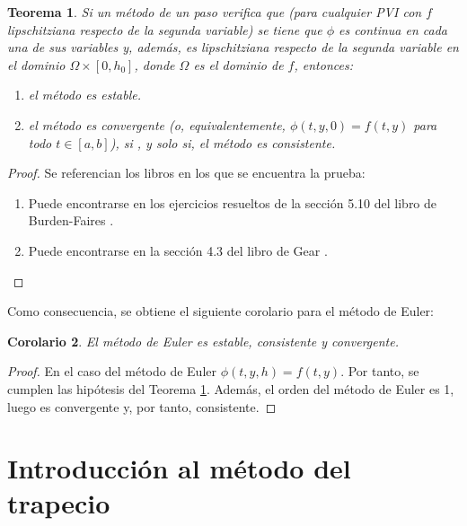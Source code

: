 \documentclass{article}
\theoremstyle{theorem-style}  %
\newtheorem{theorem}{Teorema}[section]  %
\newtheorem{corollary}[theorem]{Corolario} %
\theoremstyle{definition-style}
\theoremstyle{example-style}
\begin{document}
	\begin{theorem} \label{theorem:stability}
		Si un método de un paso verifica que (para cualquier PVI con $f$ lipschitziana respecto de la segunda variable) se tiene que $\phi$ es continua en cada una de sus variables y, además, es lipschitziana respecto de la segunda variable en el dominio $\Omega \times [0, h_0]$, donde $\Omega$ es el dominio de $f$, entonces:
		\begin{enumerate}
			\item el método es estable.
			\item el método es convergente (o, equivalentemente, $\phi(t,y,0) = f(t,y)$ para todo $t \in [a,b]$), si , y solo si, el método es consistente.
		\end{enumerate}
	\end{theorem}

	\begin{proof} Se referencian los libros en los que se encuentra la prueba:
        \begin{enumerate}
            \item Puede encontrarse en los ejercicios resueltos de la sección 5.10 del libro de Burden-Faires \cite{burden}.
            \item Puede encontrarse en la sección 4.3 del libro de Gear \cite{gear}.
        \end{enumerate}
	\end{proof}

    Como consecuencia, se obtiene el siguiente corolario para el método de Euler:

    \begin{corollary}
        El método de Euler es estable, consistente y convergente.
    \end{corollary}

    \begin{proof}
        En el caso del método de Euler $\phi(t,y,h) = f(t,y)$. Por tanto, se cumplen las hipótesis del Teorema \ref{theorem:stability}. Además, el orden del método de Euler es 1, luego es convergente y, por tanto, consistente.
    \end{proof}


\section{Introducción al método del trapecio} \label{sec:intro-trapecio}
\end{document}
